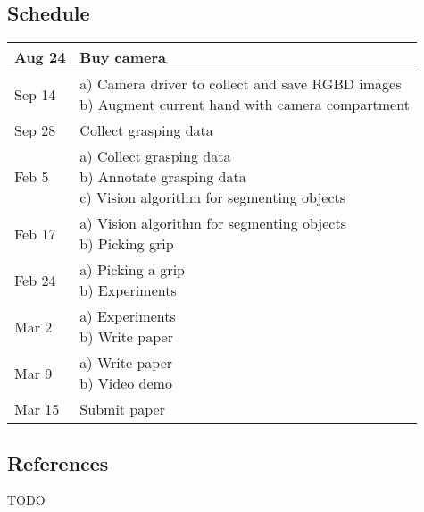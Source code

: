 \documentclass[12pt]{article}
\begin{document}
\subsection*{Schedule}
\begin{tabular}{| l | l |}
\hline
Aug 24 & Buy camera \\ \hline
Sep 14 & \pbox{20cm}{a) Camera driver to collect and save RGBD images \\
                     b) Augment current hand with camera compartment  } \\ \hline
Sep 28 & Collect grasping data \\ \hline
Feb 5 & \pbox{20cm}{a) Collect grasping data \\
                    b) Annotate grasping data \\
                    c) Vision algorithm for segmenting objects} \\ \hline
Feb 17 & \pbox{20cm}{a) Vision algorithm for segmenting objects \\
                     b) Picking grip} \\ \hline
Feb 24 & \pbox{20cm}{a) Picking a grip \\
                     b) Experiments} \\ \hline
Mar 2 & \pbox{20cm}{a) Experiments \\
                      b) Write paper} \\ \hline
Mar 9 & \pbox{20cm}{a) Write paper \\
                    b) Video demo} \\ \hline
Mar 15 & Submit paper \\ \hline
\end{tabular}

\subsection*{References}
TODO
\end{document}
